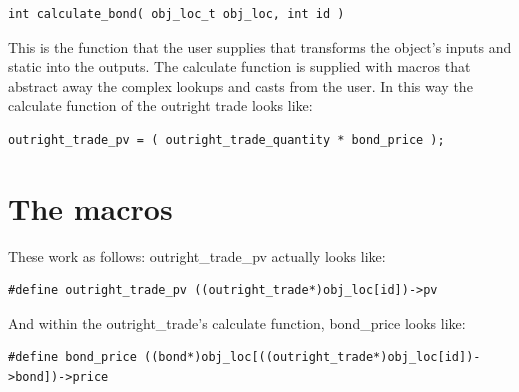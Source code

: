 \documentclass{report}
\begin{document}
\begin{verbatim}
int calculate_bond( obj_loc_t obj_loc, int id )
\end{verbatim}

This is the function that the user supplies that transforms the object's inputs and static into the outputs.  The calculate function is supplied with macros that abstract away the complex lookups and casts from the user. In this way the calculate function of the outright trade looks like:

\begin{verbatim}
outright_trade_pv = ( outright_trade_quantity * bond_price );
\end{verbatim}


\section{The macros}

These work as follows: outright_trade_pv actually looks like:

\begin{verbatim}
#define outright_trade_pv ((outright_trade*)obj_loc[id])->pv
\end{verbatim}

And within the outright_trade's calculate function, bond_price looks like:

\begin{verbatim}
#define bond_price ((bond*)obj_loc[((outright_trade*)obj_loc[id])->bond])->price
\end{verbatim}
\end{document}
